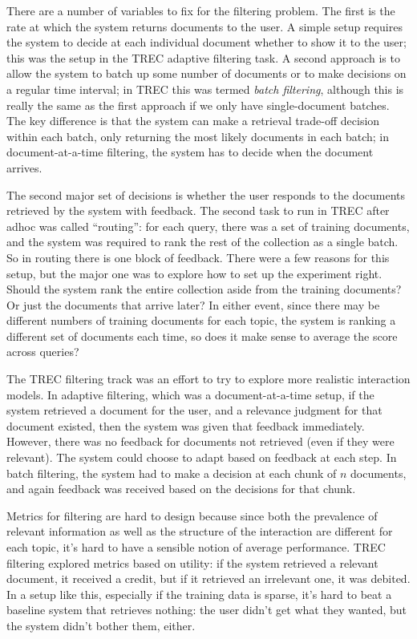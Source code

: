 \documentclass[nobib]{tufte-book}
\begin{document}
There are a number of variables to fix for the filtering problem.  The first is the rate at which the system returns documents to the user.  A simple setup requires the system to decide at each individual document whether to show it to the user; this was the setup in the TREC adaptive filtering task.  A second approach is to allow the system to batch up some number of documents or to make decisions on a regular time interval; in TREC this was termed {\it batch filtering}, although this is really the same as the first approach if we only have single-document batches.  The key difference is that the system can make a retrieval trade-off decision within each batch, only returning the most likely documents in each batch; in document-at-a-time filtering, the system has to decide when the document arrives.

The second major set of decisions is whether the user responds to the documents retrieved by the system with feedback.  The second task to run in TREC after adhoc was called ``routing'': for each query, there was a set of training documents, and the system was required to rank the rest of the collection as a single batch.  So in routing there is one block of feedback.  There were a few reasons for this setup, but the major one was to explore how to set up the experiment right.  Should the system rank the entire collection aside from the training documents?  Or just the documents that arrive later?  In either event, since there may be different numbers of training documents for each topic, the system is ranking a different set of documents each time, so does it make sense to average the score across queries?

The TREC filtering track was an effort to try to explore more realistic interaction models.  In adaptive filtering, which was a document-at-a-time setup, if the system retrieved a document for the user, and a relevance judgment for that document existed, then the system was given that feedback immediately.  However, there was no feedback for documents not retrieved (even if they were relevant).  The system could choose to adapt based on feedback at each step.  In batch filtering, the system had to make a decision at each chunk of $n$ documents, and again feedback was received based on the decisions for that chunk.

Metrics for filtering are hard to design because since both the prevalence of relevant information as well as the structure of the interaction are different for each topic, it's hard to have a sensible notion of average performance.  TREC filtering explored metrics based on utility: if the system retrieved a relevant document, it received a credit, but if it retrieved an irrelevant one, it was debited.  In a setup like this, especially if the training data is sparse, it's hard to beat a baseline system that retrieves nothing: the user didn't get what they wanted, but the system didn't bother them, either.
\end{document}
